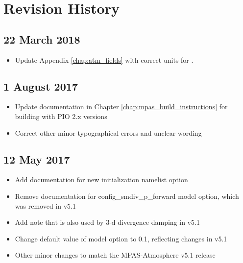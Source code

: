 
\chapter{Revision History}


\section*{22 March 2018}

\begin{itemize}
\item Update Appendix \ref{chap:atm_fields} with correct units for .
\end{itemize}

\section*{1 August 2017}

\begin{itemize}
\item Update documentation in Chapter \ref{chap:mpas_build_instructions} for building with PIO 2.x versions
\item Correct other minor typographical errors and unclear wording
\end{itemize}

\section*{12 May 2017}

\begin{itemize}
\item Add documentation for new  initialization namelist option
\item Remove documentation for config\_smdiv\_p\_forward model option, which was removed in v5.1
\item Add note that  is also used by 3-d divergence damping in v5.1
\item Change default value of  model option to 0.1, reflecting changes in v5.1
\item Other minor changes to match the MPAS-Atmosphere v5.1 release
\end{itemize}

